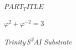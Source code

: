 \documentclass[11pt,a4paper]{article}
\begin{document}
\null\vfill
\begin{center}
{\fontsize{38pt}{46pt}\selectfont\textcolor{golden}{$PART_TITLE$}\par}
\vspace{2.5em}
{\fontsize{28pt}{34pt}\selectfont $\displaystyle \varphi^{2} + \varphi^{-2} = 3$\par}
\vspace{2.5em}
{\Large\itshape Trinity\,S\textsuperscript{3}AI Substrate\par}
\end{center}
\vfill
\end{document}
